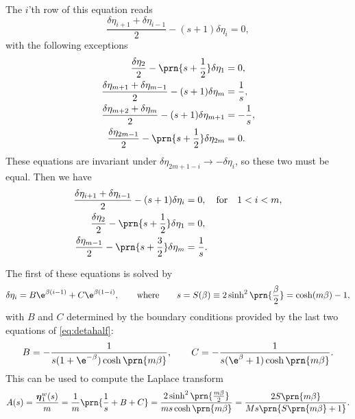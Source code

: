 \documentclass[12pt]{article}
\newcommand{\etw}{\boldsymbol{\eta}^w}
\begin{document}
The $i$'th row of this equation reads
%
\begin{equation}\label{eq:detarow}
  \frac{\delta\eta_{i+1}+\delta\eta_{i-1}}{2} - (s+1)\delta\eta_i = 0,
\end{equation}
%
with the following exceptions
%
\begin{equation}\label{eq:detabnduni}
\begin{aligned}
  \frac{\delta\eta_2}{2} - \prn{s+\frac{1}{2}}\delta\eta_1 &= 0, \\
  \frac{\delta\eta_{m+1}+\delta\eta_{m-1}}{2} - (s+1)\delta\eta_{m} &= \frac{1}{s},\\
  \frac{\delta\eta_{m+2}+\delta\eta_{m}}{2} - (s+1)\delta\eta_{m+1} &= -\frac{1}{s},\\
  \frac{\delta\eta_{2m-1}}{2} - \prn{s+\frac{1}{2}}\delta\eta_{2m} &= 0.
\end{aligned}
\end{equation}
%
These equations are invariant under $\delta\eta_{2m+1-i} \to -\delta\eta_i$, so these two must be equal.
Then we have
%
\begin{equation}\label{eq:detahalf}
\begin{aligned}
  \frac{\delta\eta_{i+1}+\delta\eta_{i-1}}{2} - (s+1)\delta\eta_i &= 0,
  \quad\text{for}\quad 1<i<m, \\
  \frac{\delta\eta_2}{2} - \prn{s+\frac{1}{2}}\delta\eta_1 &= 0, \\
  \frac{\delta\eta_{m-1}}{2} - \prn{s+\frac{3}{2}}\delta\eta_{m} &= \frac{1}{s}.
\end{aligned}
\end{equation}
%

The first of these equations is solved by
%
\begin{equation}\label{eq:detagensol}
  \delta\eta_i = B\e^{\beta(i-1)} + C\e^{\beta(1-i)},
  \qquad\text{where}\qquad
  s = S(\beta) \equiv 2 \sinh^2 \prn{\frac{\beta}{2}}
    = \cosh (m\beta) - 1,
\end{equation}
%
with $B$ and $C$ determined by the boundary conditions provided by the last two equations of \eqref{eq:detahalf}:
%
\begin{equation}\label{eq:unicoeffs}
  B = -\frac{1}{s(1 + \e^{-\beta}) \cosh \prn{m \beta}},
  \qquad
  C = -\frac{1}{s(\e^{\beta} + 1) \cosh \prn{m \beta}}.
\end{equation}
%
This can be used to compute the Laplace transform
%
\begin{equation}\label{eq:unilaplace}
  A(s) = \frac{\etw_1(s)}{m}
   = \frac{1}{m}\prn{\frac{1}{s}+B+C}
   = \frac{2\sinh^2\prn{\frac{m \beta}{2}}}{m s \cosh\prn{m \beta}}
   = \frac{2 S\prn{m \beta}}{M s \prn{S\prn{m \beta} + 1}}.
\end{equation}
%
\end{document}
